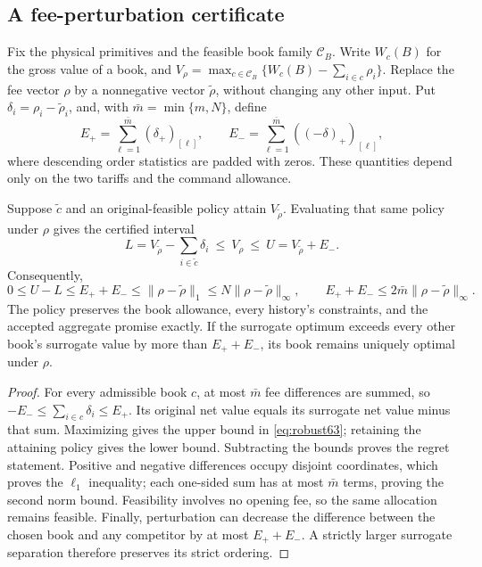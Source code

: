 \subsection{A fee-perturbation certificate}
Fix the physical primitives and the feasible book family $\mathcal C_B$. Write $W_c(B)$ for the gross value of a book, and $V_\rho=\max_{c\in\mathcal C_B}\{W_c(B)-\sum_{i\in c}\rho_i\}$. Replace the fee vector $\rho$ by a nonnegative vector $\widetilde\rho$, without changing any other input. Put $\delta_i=\rho_i-\widetilde\rho_i$, and, with $\bar m=\min\{m,N\}$, define
\[
 E_+=\sum_{\ell=1}^{\bar m}(\delta_+)_{[\ell]},\qquad
 E_-=\sum_{\ell=1}^{\bar m}((-\delta)_+)_{[\ell]},
\]
where descending order statistics are padded with zeros. These quantities depend only on the two tariffs and the command allowance.
\begin{theorem}\label{thm:robust63}
Suppose $\widetilde c$ and an original-feasible policy attain $V_{\widetilde\rho}$. Evaluating that same policy under $\rho$ gives the certified interval
\begin{equation}\label{eq:robust63}
 L=V_{\widetilde\rho}-\sum_{i\in\widetilde c}\delta_i
 \ \leq\ V_\rho\ \leq\ U=V_{\widetilde\rho}+E_-.
\end{equation}
Consequently,
\[
 0\leq U-L\leq E_++E_-\leq\|\rho-\widetilde\rho\|_1
 \leq N\|\rho-\widetilde\rho\|_\infty,
 \qquad E_++E_-\leq2\bar m\|\rho-\widetilde\rho\|_\infty.
\]
The policy preserves the book allowance, every history's constraints, and the accepted aggregate promise exactly. If the surrogate optimum exceeds every other book's surrogate value by more than $E_++E_-$, its book remains uniquely optimal under $\rho$.
\end{theorem}
\begin{proof}
For every admissible book $c$, at most $\bar m$ fee differences are summed, so
$-E_-\leq\sum_{i\in c}\delta_i\leq E_+$. Its original net value equals its surrogate net value minus that sum. Maximizing gives the upper bound in \eqref{eq:robust63}; retaining the attaining policy gives the lower bound. Subtracting the bounds proves the regret statement. Positive and negative differences occupy disjoint coordinates, which proves the $\ell_1$ inequality; each one-sided sum has at most $\bar m$ terms, proving the second norm bound. Feasibility involves no opening fee, so the same allocation remains feasible. Finally, perturbation can decrease the difference between the chosen book and any competitor by at most $E_++E_-$. A strictly larger surrogate separation therefore preserves its strict ordering.
\end{proof}

